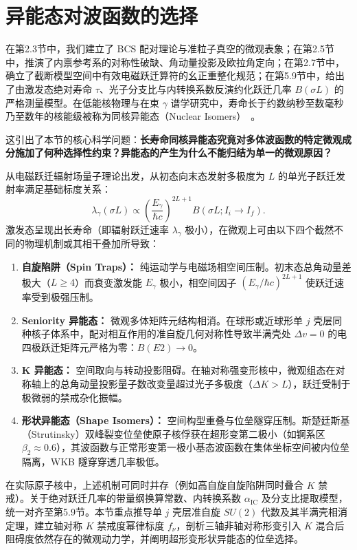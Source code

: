 \section{异能态对波函数的选择}\label{sec:4-6}

在第2.3节中，我们建立了 BCS 配对理论与准粒子真空的微观表象；在第2.5节中，推演了内禀参考系的对称性破缺、角动量投影及欧拉角定向；在第2.7节中，确立了截断模型空间中有效电磁跃迁算符的幺正重整化规范；在第5.9节中，给出了由激发态绝对寿命 $\tau$、光子分支比与内转换系数反演约化跃迁几率 $B(\sigma L)$ 的严格测量模型。在低能核物理与在束 $\gamma$ 谱学研究中，寿命长于约数纳秒至数毫秒乃至数年的核能级被称为同核异能态（Nuclear Isomers）~\cite{book-jain-nuclear-isomers,walker-1999-nature-nuclear-isomers}。

这引出了本节的核心科学问题：\textbf{长寿命同核异能态究竟对多体波函数的特定微观成分施加了何种选择性约束？异能态的产生为什么不能归结为单一的微观原因？}

从电磁跃迁辐射场量子理论出发，从初态向末态发射多极度为 $L$ 的单光子跃迁发射率满足基础标度关系：
\begin{equation}\label{eq:4-6-rate-scaling}
\lambda_\gamma(\sigma L) \propto \left(\frac{E_\gamma}{\hbar c}\right)^{2L + 1} B(\sigma L; I_i \to I_f).
\end{equation}
激发态呈现出长寿命（即辐射跃迁速率 $\lambda_\gamma$ 极小），在微观上可由以下四个截然不同的物理机制或其相干叠加所导致：
\begin{enumerate}
\item \textbf{自旋陷阱（Spin Traps）：} 纯运动学与电磁场相空间压制。初末态总角动量差极大（$L \ge 4$）而衰变激发能 $E_\gamma$ 极小，相空间因子 $(E_\gamma/\hbar c)^{2L+1}$ 使跃迁速率受到极强压制。
\item \textbf{Seniority 异能态：} 微观多体矩阵元结构相消。在球形或近球形单 $j$ 壳层同种核子体系中，配对相互作用的准自旋几何对称性导致半满壳处 $\Delta v = 0$ 的电四极跃迁矩阵元严格为零：$B(E2) \to 0$。
\item \textbf{K 异能态：} 空间取向与转动投影阻碍。在轴对称强变形核中，微观组态在对称轴上的总角动量投影量子数改变量超过光子多极度（$\Delta K > L$），跃迁受制于极微弱的禁戒杂化振幅。
\item \textbf{形状异能态（Shape Isomers）：} 空间构型重叠与位垒隧穿压制。斯楚廷斯基（Strutinsky）双峰裂变位垒使原子核俘获在超形变第二极小（如锕系区 $\beta_2 \approx 0.6$），其波函数与正常形变第一极小基态波函数在集体坐标空间被内位垒隔离，WKB 隧穿穿透几率极低。
\end{enumerate}
在实际原子核中，上述机制可同时并存（例如高自旋自旋陷阱同时叠合 $K$ 禁戒）。关于绝对跃迁几率的带量纲换算常数、内转换系数 $\alpha_{\mathrm{IC}}$ 及分支比提取模型，统一对齐至第5.9节。本节重点推导单 $j$ 壳层准自旋 $SU(2)$ 代数及其半满壳相消定理，建立轴对称 $K$ 禁戒度幂律标度 $f_\nu$，剖析三轴非轴对称形变引入 $K$ 混合后阻碍度依然存在的微观动力学，并阐明超形变形状异能态的位垒选择。

